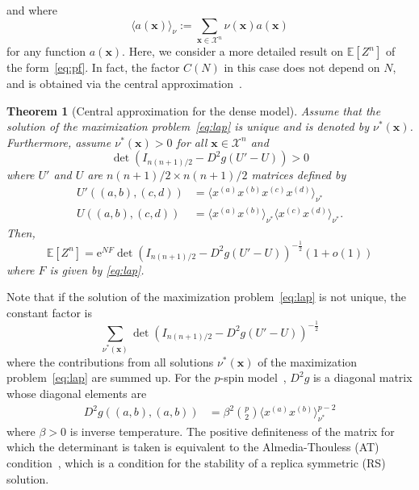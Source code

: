 \documentclass[conference,twocolumns]{IEEEtran}
\theoremstyle{plain}
\newtheorem{theorem}{Theorem}
\begin{document}
and where
\begin{equation*}
\langle a(\bm{x})\rangle_\nu:=\sum_{\bm{x}\in\mathcal{X}^n}\nu(\bm{x})a(\bm{x})
\end{equation*}
for any function $a(\bm{x})$.
Here, we consider a more detailed result on $\mathbb{E}[Z^n]$ of the form~\eqref{eq:pf}.
In fact, the factor $C(N)$ in this case does not depend on $N$,
and is obtained via the central approximation~\cite{flajolet2009analytic}.
\begin{theorem}[Central approximation for the dense model]\label{thm:dense}
Assume that the solution of the maximization problem~\eqref{eq:lap} is unique and is denoted by $\nu^*(\bm{x})$.
Furthermore, assume $\nu^*(\bm{x})>0$ for all $\bm{x}\in\mathcal{X}^n$
and
\begin{equation*}
\det\left(I_{n(n+1)/2} - D^2g(U'-U)\right)>0
\end{equation*}
where $U'$ and $U$ are $n(n+1)/2\times n(n+1)/2$ matrices defined by
\begin{align*}
U'((a,b),(c,d))&= \langle x^{(a)}x^{(b)}x^{(c)}x^{(d)}\rangle_{\nu^*}\\
U((a,b),(c,d))&= \langle x^{(a)}x^{(b)}\rangle_{\nu^*}\langle x^{(c)}x^{(d)}\rangle_{\nu^*}.
\end{align*}
Then,
\begin{equation*}
\mathbb{E}[Z^n] = \mathrm{e}^{NF}
\det\left(I_{n(n+1)/2} - D^2g(U'-U)\right)^{-\frac12}(1+o(1))
\end{equation*}
where $F$ is given by \eqref{eq:lap}.
\end{theorem}
Note that if the solution of the maximization problem~\eqref{eq:lap} is not unique,
the constant factor is
\begin{equation*}
\sum_{\nu^*(\bm{x})}\det\left(I_{n(n+1)/2} - D^2g(U'-U)\right)^{-\frac12}
\end{equation*}
where the contributions from all solutions $\nu^*(\bm{x})$ of the maximization problem~\eqref{eq:lap} are summed up.
For the $p$-spin model~\cite{mezard2009ipa}, $D^2 g$ is a diagonal matrix whose diagonal elements are
\begin{align*}
D^2g((a,b),(a,b))&=
\beta^2\binom{p}{2}\langle x^{(a)}x^{(b)}\rangle_{\nu^*}^{p-2}
\end{align*}
where $\beta>0$ is inverse temperature.
The positive definiteness of the matrix for which the determinant is taken is equivalent to the Almedia-Thouless (AT) condition~\cite{almeida1978stability},
which is a condition for the stability of a replica symmetric (RS) solution.
\end{document}
